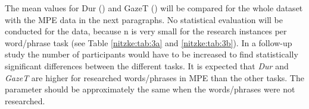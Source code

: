 \documentclass[output=paper]{langsci/langscibook}
\begin{document}
The mean values for Dur () and GazeT () will be compared for the whole dataset with the MPE data in the next paragraphs. No statistical evaluation will be conducted for the data, because n is very small for the research instances per word/phrase task (see Table \ref{nitzke:tab:3a} and \ref{nitzke:tab:3b}). In a follow-up study the number of participants would have to be increased to find statistically significant differences between the different tasks. It is expected that \textit{Dur }and\textit{ GazeT }are higher for researched words/phrases in MPE than the other tasks. The parameter should be approximately the same when the words/phrases were not researched.

\end{document}

